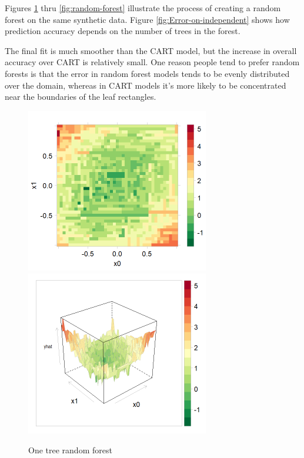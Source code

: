 \documentclass[10pt,openany]{article}
\numberwithin{definition}{section}
\numberwithin{example}{section}
\numberwithin{equation}{section}
\numberwithin{figure}{section}
\begin{document}
Figures \ref{fig:One-tree-random} thru \ref{fig:random-forest} illustrate
the process of creating a random forest on the same synthetic data.
Figure \ref{fig:Error-on-independent} shows how prediction accuracy
depends on the number of trees in the forest.

The final fit is much smoother than the CART model, but the increase
in overall accuracy over CART is relatively small. One reason people
tend to prefer random forests is that the error in random forest models
tends to be evenly distributed over the domain, whereas in CART models
it's more likely to be concentrated near the boundaries of the leaf
rectangles.

\begin{figure}[t]
\noindent \begin{centering}
\includegraphics[width=80mm]{../fig/rf-1-tree-levelplot}~
\includegraphics[width=80mm]{../fig/rf-1-tree-wireframe}
\par\end{centering}
\protect\caption{\label{fig:One-tree-random}One tree random forest}
\end{figure}
\end{document}
